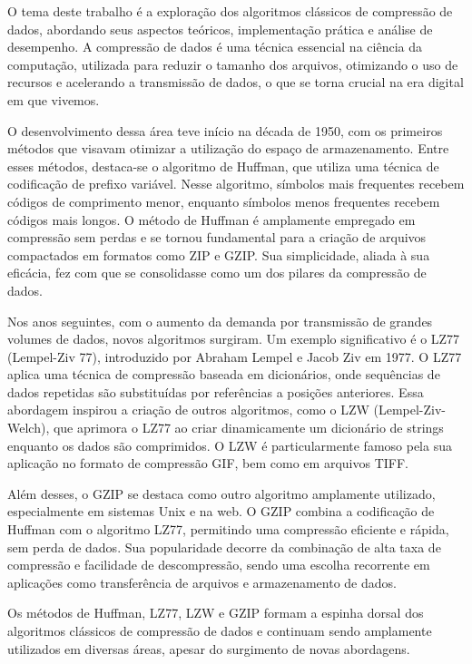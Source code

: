 O tema deste trabalho é a exploração dos algoritmos clássicos de compressão de dados, abordando seus aspectos teóricos, implementação prática e análise de desempenho. A compressão de dados é uma técnica essencial na ciência da computação, utilizada para reduzir o tamanho dos arquivos, otimizando o uso de recursos e acelerando a transmissão de dados, o que se torna crucial na era digital em que vivemos.

O desenvolvimento dessa área teve início na década de 1950, com os primeiros métodos que visavam otimizar a utilização do espaço de armazenamento. Entre esses métodos, destaca-se o algoritmo de Huffman, que utiliza uma técnica de codificação de prefixo variável. Nesse algoritmo, símbolos mais frequentes recebem códigos de comprimento menor, enquanto símbolos menos frequentes recebem códigos mais longos. O método de Huffman é amplamente empregado em compressão sem perdas e se tornou fundamental para a criação de arquivos compactados em formatos como ZIP e GZIP. Sua simplicidade, aliada à sua eficácia, fez com que se consolidasse como um dos pilares da compressão de dados.

Nos anos seguintes, com o aumento da demanda por transmissão de grandes volumes de dados, novos algoritmos surgiram. Um exemplo significativo é o LZ77 (Lempel-Ziv 77), introduzido por Abraham Lempel e Jacob Ziv em 1977. O LZ77 aplica uma técnica de compressão baseada em dicionários, onde sequências de dados repetidas são substituídas por referências a posições anteriores. Essa abordagem inspirou a criação de outros algoritmos, como o LZW (Lempel-Ziv-Welch), que aprimora o LZ77 ao criar dinamicamente um dicionário de strings enquanto os dados são comprimidos. O LZW é particularmente famoso pela sua aplicação no formato de compressão GIF, bem como em arquivos TIFF.

Além desses, o GZIP se destaca como outro algoritmo amplamente utilizado, especialmente em sistemas Unix e na web. O GZIP combina a codificação de Huffman com o algoritmo LZ77, permitindo uma compressão eficiente e rápida, sem perda de dados. Sua popularidade decorre da combinação de alta taxa de compressão e facilidade de descompressão, sendo uma escolha recorrente em aplicações como transferência de arquivos e armazenamento de dados.

Os métodos de Huffman, LZ77, LZW e GZIP formam a espinha dorsal dos algoritmos clássicos de compressão de dados e continuam sendo amplamente utilizados em diversas áreas, apesar do surgimento de novas abordagens.

